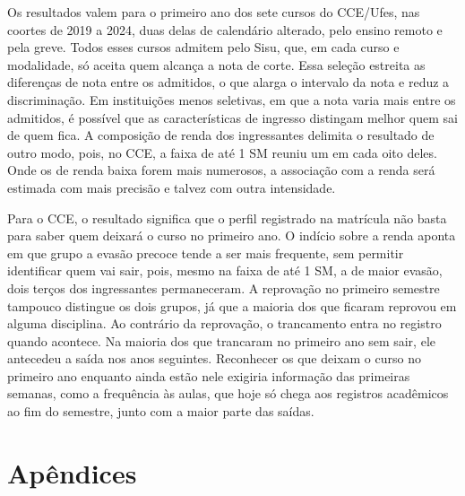 \documentclass[12pt,a4paper]{article}
\newcommand\apendicetoc[1]{\appendixname~#1~--~}
\begin{document}
Os resultados valem para o primeiro ano dos sete cursos do CCE/Ufes, nas coortes de 2019 a 2024, duas delas de calendário alterado, pelo ensino remoto e pela greve. Todos esses cursos admitem pelo Sisu, que, em cada curso e modalidade, só aceita quem alcança a nota de corte. Essa seleção estreita as diferenças de nota entre os admitidos, o que alarga o intervalo da nota e reduz a discriminação. Em instituições menos seletivas, em que a nota varia mais entre os admitidos, é possível que as características de ingresso distingam melhor quem sai de quem fica. A composição de renda dos ingressantes delimita o resultado de outro modo, pois, no CCE, a faixa de até 1 SM reuniu um em cada oito deles. Onde os de renda baixa forem mais numerosos, a associação com a renda será estimada com mais precisão e talvez com outra intensidade.

Para o CCE, o resultado significa que o perfil registrado na matrícula não basta para saber quem deixará o curso no primeiro ano. O indício sobre a renda aponta em que grupo a evasão precoce tende a ser mais frequente, sem permitir identificar quem vai sair, pois, mesmo na faixa de até 1 SM, a de maior evasão, dois terços dos ingressantes permaneceram. A reprovação no primeiro semestre tampouco distingue os dois grupos, já que a maioria dos que ficaram reprovou em alguma disciplina. Ao contrário da reprovação, o trancamento entra no registro quando acontece. Na maioria dos que trancaram no primeiro ano sem sair, ele antecedeu a saída nos anos seguintes. Reconhecer os que deixam o curso no primeiro ano enquanto ainda estão nele exigiria informação das primeiras semanas, como a frequência às aulas, que hoje só chega aos registros acadêmicos ao fim do semestre, junto com a maior parte das saídas.

\clearpage
{}



\clearpage
\section*{Apêndices}
\appendix
\titleformat{\section}{\Large\bfseries}{\appendixname~\thesection~--~}{0pt}{}
\end{document}

